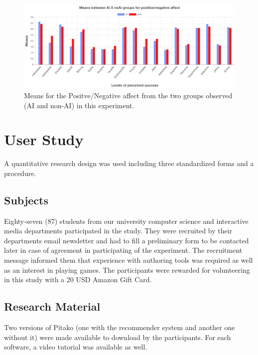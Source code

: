 \documentclass[letterpaper]{article} %
\begin{document}
\begin{figure}[ht]
  \includegraphics[width=\linewidth]{panas.png}
  \caption{Means for the Positve/Negative affect from the two groups observed (AI and non-AI) in this experiment.}
  \label{panas}
\end{figure}

\section{User Study}
A quantitative research design was used including three standardized forms and a procedure.

\subsection{Subjects}
Eighty-seven (87) students from our university computer science and interactive media departments participated in the study. They were recruited by their departments email newsletter and had to fill a preliminary form to be contacted later in case of agreement in participating of the experiment. The recruitment message informed them that experience with authoring tools was required as well as an interest in playing games. The participants were rewarded for volunteering in this study with a 20 USD Amazon Gift Card.

\subsection{Research Material}
Two versions of Pitako (one with the recommender system and another one without it) were made available to download by the participants. For each software, a video tutorial was available as well.
\end{document}
